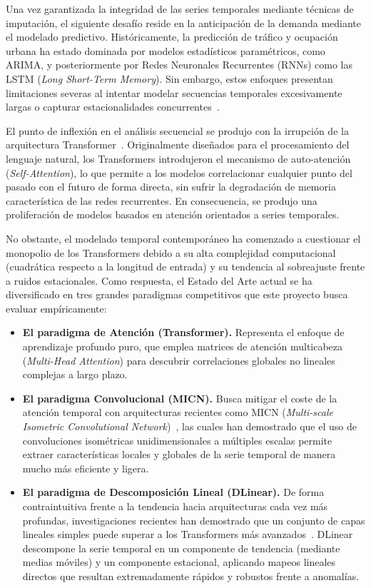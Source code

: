 Una vez garantizada la integridad de las series temporales mediante técnicas de imputación, el siguiente desafío reside en la anticipación de la demanda mediante el modelado predictivo. Históricamente, la predicción de tráfico y ocupación urbana ha estado dominada por modelos estadísticos paramétricos, como ARIMA, y posteriormente por Redes Neuronales Recurrentes (RNNs) como las LSTM (\textit{Long Short-Term Memory}). Sin embargo, estos enfoques presentan limitaciones severas al intentar modelar secuencias temporales excesivamente largas o capturar estacionalidades concurrentes~\cite{vaswani2017attention}.

El punto de inflexión en el análisis secuencial se produjo con la irrupción de la arquitectura Transformer~\cite{vaswani2017attention}. Originalmente diseñados para el procesamiento del lenguaje natural, los Transformers introdujeron el mecanismo de auto-atención (\textit{Self-Attention}), lo que permite a los modelos correlacionar cualquier punto del pasado con el futuro de forma directa, sin sufrir la degradación de memoria característica de las redes recurrentes. En consecuencia, se produjo una proliferación de modelos basados en atención orientados a series temporales. 

No obstante, el modelado temporal contemporáneo ha comenzado a cuestionar el monopolio de los Transformers debido a su alta complejidad computacional (cuadrática respecto a la longitud de entrada) y su tendencia al sobreajuste frente a ruidos estacionales. Como respuesta, el Estado del Arte actual se ha diversificado en tres grandes paradigmas competitivos que este proyecto busca evaluar empíricamente:

\begin{itemize}
	\item \textbf{El paradigma de Atención (Transformer).} Representa el enfoque de aprendizaje profundo puro, que emplea matrices de atención multicabeza (\textit{Multi-Head Attention}) para descubrir correlaciones globales no lineales complejas a largo plazo.
	
	\item \textbf{El paradigma Convolucional (MICN).} Busca mitigar el coste de la atención temporal con arquitecturas recientes como MICN (\textit{Multi-scale Isometric Convolutional Network})~\cite{wang2023micn}, las cuales han demostrado que el uso de convoluciones isométricas unidimensionales a múltiples escalas permite extraer características locales y globales de la serie temporal de manera mucho más eficiente y ligera.
	
	\item \textbf{El paradigma de Descomposición Lineal (DLinear).} De forma contraintuitiva frente a la tendencia hacia arquitecturas cada vez más profundas, investigaciones recientes han demostrado que un conjunto de capas lineales simples puede superar a los Transformers más avanzados~\cite{zeng2023are}. DLinear descompone la serie temporal en un componente de tendencia (mediante medias móviles) y un componente estacional, aplicando mapeos lineales directos que resultan extremadamente rápidos y robustos frente a anomalías.
\end{itemize}

